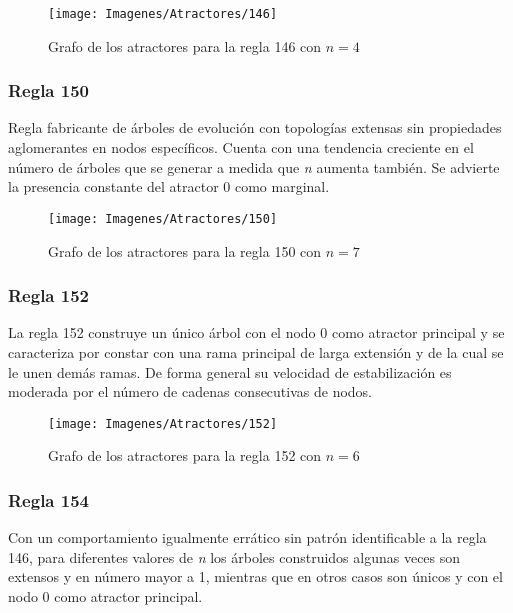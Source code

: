 \documentclass[]{article}
\begin{document}
				\hfill\break
				\hfill\break
				\begin{figure}[!h]
					\centering
					\texttt{[image: Imagenes/Atractores/146]}
					\caption{Grafo de los atractores para la regla 146 con $n=4$}
					\label{Regla_146}
				\end{figure}
			
			\newpage
			\subsubsection{Regla 150}
				\justifying
				Regla fabricante de árboles de evolución con topologías extensas sin propiedades aglomerantes en nodos específicos. Cuenta con una tendencia creciente en el número de árboles que se generar a medida que \textit{n} aumenta también. Se advierte la presencia constante del atractor 0 como marginal.
				
				\hfill\break
				\hfill\break
				\begin{figure}[!h]
					\centering
					\texttt{[image: Imagenes/Atractores/150]}
					\caption{Grafo de los atractores para la regla 150 con $n=7$}
					\label{Regla_150}
				\end{figure}
			
			\newpage
			\subsubsection{Regla 152}
				\justifying
				La regla 152 construye un único árbol con el nodo 0 como atractor principal y se caracteriza por constar con una rama principal de larga extensión y de la cual se le unen demás ramas. De forma general su velocidad de estabilización es moderada por el número de cadenas consecutivas de nodos.
				
				\hfill\break
				\hfill\break
				\begin{figure}[!h]
					\centering
					\texttt{[image: Imagenes/Atractores/152]}
					\caption{Grafo de los atractores para la regla 152 con $n=6$}
					\label{Regla_152}
				\end{figure}
			
			
			\newpage
			\subsubsection{Regla 154}
				\justifying	
				Con un comportamiento igualmente errático sin patrón identificable a la regla 146, para diferentes valores de \textit{n} los árboles construidos algunas veces son extensos y en número mayor a 1, mientras que en otros casos son únicos y con el nodo 0 como atractor principal.
				
\end{document}
